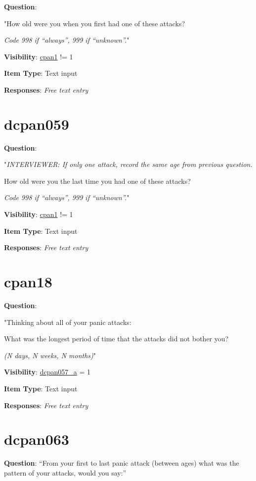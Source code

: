 \documentclass[]{book}
\begin{document}
\textbf{Question}:

"How old were you when you first had one of these attacks?

\emph{Code 998 if ``always'', 999 if ``unknown''.}"

\textbf{Visibility}: \protect\hyperlink{cpan1}{cpan1} != 1

\textbf{Item Type}: Text input

\textbf{Responses}: \emph{Free text entry}

\hypertarget{dcpan059}{%
\section{dcpan059}\label{dcpan059}}

\textbf{Question}:

"\emph{INTERVIEWER: If only one attack, record the same age from previous question.}

How old were you the last time you had one of these attacks?

\emph{Code 998 if ``always'', 999 if ``unknown''.}"

\textbf{Visibility}: \protect\hyperlink{cpan1}{cpan1} != 1

\textbf{Item Type}: Text input

\textbf{Responses}: \emph{Free text entry}

\hypertarget{cpan18}{%
\section{cpan18}\label{cpan18}}

\textbf{Question}:

"Thinking about all of your panic attacks:

What was the longest period of time that the attacks did not bother you?

\emph{(N days, N weeks, N months)}"

\textbf{Visibility}: \protect\hyperlink{dcpan057_a}{dcpan057\_a} = 1

\textbf{Item Type}: Text input

\textbf{Responses}: \emph{Free text entry}

\hypertarget{dcpan063}{%
\section{dcpan063}\label{dcpan063}}

\textbf{Question}: ``From your first to last panic attack (between ages) what was the pattern of your attacks, would you say:''
\end{document}
